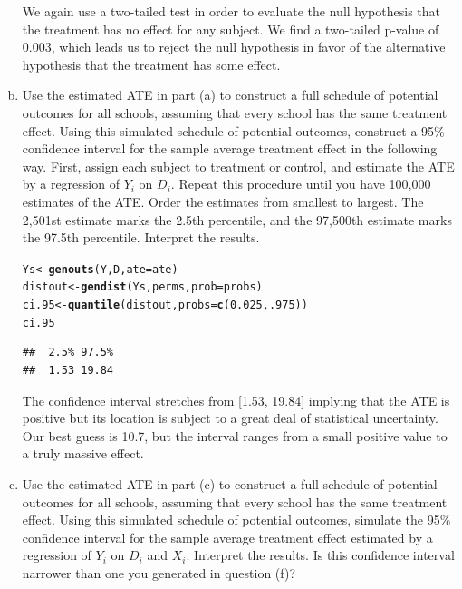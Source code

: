\documentclass[11pt,notitlepage]{article}\usepackage[]{graphicx}\usepackage[]{color}
\makeatletter
\newcommand{\hlnum}[1]{\textcolor[rgb]{0.686,0.059,0.569}{#1}}%
\newcommand{\hlstd}[1]{\textcolor[rgb]{0.345,0.345,0.345}{#1}}%
\newcommand{\hlkwb}[1]{\textcolor[rgb]{0.69,0.353,0.396}{#1}}%
\newcommand{\hlkwc}[1]{\textcolor[rgb]{0.333,0.667,0.333}{#1}}%
\newcommand{\hlkwd}[1]{\textcolor[rgb]{0.737,0.353,0.396}{\textbf{#1}}}%
\newenvironment{kframe}{%
 \def\at@end@of@kframe{}%
 \ifinner\ifhmode%
  \def\at@end@of@kframe{\end{minipage}}%
  \begin{minipage}{\columnwidth}%
 \fi\fi%
 \def\FrameCommand##1{\hskip\@totalleftmargin \hskip-\fboxsep
 \colorbox{shadecolor}{##1}\hskip-\fboxsep
     \hskip-\linewidth \hskip-\@totalleftmargin \hskip\columnwidth}%
 \MakeFramed {\advance\hsize-\width
   \@totalleftmargin\z@ \linewidth\hsize
   \@setminipage}}%
 {\par\unskip\endMakeFramed%
 \at@end@of@kframe}
\newenvironment{knitrout}{}{} %
\makeatother
\begin{document}
\begin{enumerate}[a)]
We again use a two-tailed test in order to evaluate the null hypothesis that the treatment has no effect for any subject.  We find a two-tailed p-value of 0.003, which leads us to reject the null hypothesis in favor of the alternative hypothesis that the treatment has some effect.

\item Use the estimated ATE in part (a) to construct a full schedule of potential outcomes for all schools, assuming that every school has the same treatment effect. Using this simulated schedule of potential outcomes, construct a 95\% confidence interval for the sample average treatment effect in the following way. First, assign each subject to treatment or control, and estimate the ATE by a regression of $Y_i$ on $D_i$. Repeat this procedure until you have 100,000 estimates of the ATE.  Order the estimates from smallest to largest. The 2,501st estimate marks the 2.5th percentile, and the 97,500th estimate marks the 97.5th percentile. Interpret the results.

\begin{knitrout}
\color{fgcolor}\begin{kframe}
\begin{alltt}
\hlstd{Ys} \hlkwb{<-} \hlkwd{genouts}\hlstd{(Y,D,}\hlkwc{ate}\hlstd{=ate)}
\hlstd{distout} \hlkwb{<-} \hlkwd{gendist}\hlstd{(Ys,perms,}\hlkwc{prob}\hlstd{=probs)}
\hlstd{ci.95} \hlkwb{<-} \hlkwd{quantile}\hlstd{(distout,} \hlkwc{probs}\hlstd{=}\hlkwd{c}\hlstd{(}\hlnum{0.025}\hlstd{,} \hlnum{.975}\hlstd{))}
\hlstd{ci.95}
\end{alltt}
\begin{verbatim}
##  2.5% 97.5% 
##  1.53 19.84
\end{verbatim}
\end{kframe}
\end{knitrout}

The confidence interval stretches from [1.53, 19.84] implying that the ATE is positive but its location is subject to a great deal of statistical uncertainty.  Our best guess is 10.7, but the interval ranges from a small positive value to a truly massive effect.

\item Use the estimated ATE in part (c) to construct a full schedule of potential outcomes for all schools, assuming that every school has the same treatment effect.  Using this simulated schedule of potential outcomes, simulate the 95\% confidence interval for the sample average treatment effect estimated by a regression of $Y_i$ on $D_i$ and $X_i$.  Interpret the results.  Is this confidence interval narrower than one you generated in question (f)?  


\end{enumerate}
\end{document}
